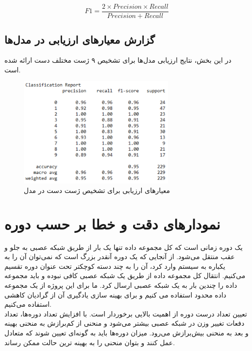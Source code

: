 \[ F1  = \frac{2 \times Precision \times Recall}{Precision + Recall} \]



\subsection{گزارش معیارهای ارزیابی در مدل‌ها}
در این بخش، نتایج ارزیابی مدل‌ها برای تشخیص ۹ ژست مختلف دست ارائه شده است.

\begin{figure}[h]
    \centering
    \includegraphics[width=0.7\textwidth]{textchart.png}
    \caption{ معیارهای ارزیابی برای تشخیص ژست دست در مدل }
\end{figure}



\section{نمودار‌های دقت و خطا بر حسب دوره}
یک دوره زمانی است که کل مجموعه داده تنها یک بار از طریق شبکه عصبی به جلو و عقب منتقل می‌شود. از آنجایی که یک دوره آنقدر بزرگ است که نمی‌توان آن را به یکباره به سیستم وارد کرد، آن را به چند دسته کوچکتر تحت عنوان دوره 
تقسیم می‌کنیم.  انتقال کل مجموعه داده از طریق یک شبکه عصبی کافی نبوده و باید مجموعه داده را چندین بار به یک شبکه عصبی ارسال کرد. ما برای این پروژه از یک مجموعه داده محدود استفاده می کنیم و برای بهینه سازی یادگیری آن از گرادیان کاهشی استفاده می‌کنیم. 
\\
تعیین تعداد درست دوره از اهمیت بالایی برخوردار است. با افزایش تعداد دوره‌ها،‌ تعداد دفعات تغییر وزن در شبکه عصبی بیشتر می‌شود و منحنی از کم‌برازش به منحنی بهینه و بعد به 
منحنی بیش‌برازش  می‌رود. میزان دوره‌ها باید به گونه‌ای تعیین شوند که متعادل عمل کنند و بتوان منحنی را به بهینه ترین حالت ممکن رساند.

